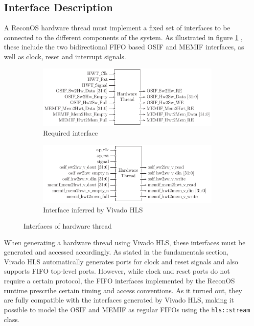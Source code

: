 \subsection{Interface Description}
A ReconOS hardware thread must implement a fixed set of interfaces to be
connected to the different components of the system. As illustrated in figure
\ref{fig:hwt_if_o} , these include the two bidirectional
\ac{FIFO} based \ac{OSIF} and \ac{MEMIF} interfaces, as well as clock, reset
and interrupt signals.
\begin{figure}
	\centering
	\begin{subfigure}{10.2cm}
		\centering
		\includegraphics{../figures/hwt_if_o}
		\caption{Required interface}
		\label{fig:hwt_if_o}
	\end{subfigure}
	\par\bigskip
	\begin{subfigure}{10.2cm}
		\centering
		\includegraphics{../figures/hwt_if_h}
		\caption{Interface inferred by Vivado HLS}
		\label{fig:hwt_if_h}
	\end{subfigure}
	\caption{Interfaces of hardware thread}
	\label{fig:hwt_if}
\end{figure}
When generating a hardware thread using Vivado HLS, these interfaces must be
generated and accessed accordingly. As stated in the fundamentals section,
Vivado HLS automatically generates ports for clock and reset signals and also
supports \ac{FIFO} top-level ports. However, while clock and reset ports do
not require a certain protocol, the \ac{FIFO} interfaces implemented by the
ReconOS runtime prescribe certain timing and access conventions. As it turned
out, they are fully compatible with the interfaces generated by Vivado HLS,
making it possible to model the \ac{OSIF} and \ac{MEMIF} as regular \acp{FIFO}
using the \lstinline{hls::stream} class.

